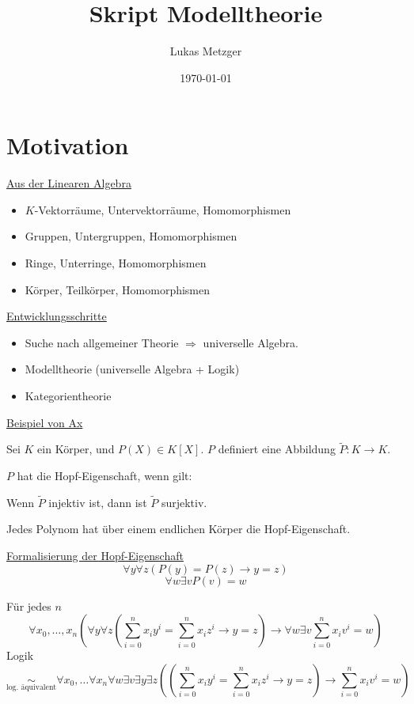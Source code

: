 \documentclass[12pt,parskip=full]{scrartcl}
\title{Skript Modelltheorie}
\author{Lukas Metzger}
\date{\today}
\newcommand{\heading}{\underline}
\theoremstyle{definition}
\begin{document}
	\maketitle
	
	\setcounter{section}{-1}
	\section{Motivation}
	
	\heading{Aus der Linearen Algebra}
	\begin{itemize}
		\item $K$-Vektorräume, Untervektorräume, Homomorphismen
		\item Gruppen, Untergruppen, Homomorphismen
		\item Ringe, Unterringe, Homomorphismen
		\item Körper, Teilkörper, Homomorphismen
	\end{itemize}

	\heading{Entwicklungsschritte}
	\begin{itemize}
		\item Suche nach allgemeiner Theorie $\Rightarrow$ universelle Algebra.
		\item Modelltheorie (universelle Algebra + Logik)
		\item Kategorientheorie
	\end{itemize}

	\heading{Beispiel von Ax}
	
	Sei $K$ ein Körper, und $P(X) \in K[X]$. $P$ definiert eine Abbildung $\tilde{P}: K \to K$.
	
	$P$ hat die Hopf-Eigenschaft, wenn gilt:
	\begin{center}
		Wenn $\tilde{P}$ injektiv ist, dann ist $\tilde{P}$ surjektiv.
	\end{center}

	Jedes Polynom hat über einem endlichen Körper die Hopf-Eigenschaft.
	
	\heading{Formalisierung der Hopf-Eigenschaft}
	\begin{equation*}
		\forall y \forall z (P(y) = P(z) \rightarrow y = z)
	\end{equation*}
	\begin{equation*}
		\forall w \exists v P(v) = w
	\end{equation*}
	
	Für jedes $n$
	\begin{equation*}
		\forall x_0, \dots, x_n \left(\forall y \forall z \left(\sum_{i=0}^{n} x_i y^i = \sum_{i=0}^n x_i z^i \rightarrow y = z\right) \rightarrow \forall w \exists v \sum_{i=0}^n x_i v^i = w\right)
	\end{equation*}
	Logik
	\begin{equation*}
		\underset{\text{log. äquivalent}}{\sim} \forall x_0, \dots \forall x_n \forall w \exists v \exists y \exists z \left( \left( \sum_{i=0}^{n} x_i y^i = \sum_{i=0}^n x_i z^i \rightarrow y = z \right) \rightarrow \sum_{i=0}^n x_i v^i = w \right)
	\end{equation*}
	
\end{document}
